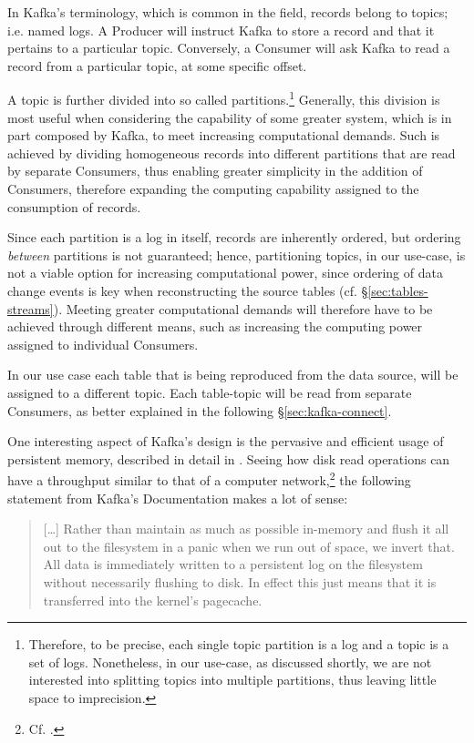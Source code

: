 In Kafka's terminology, which is common in the field, records belong to topics; i.e. named logs.
A Producer will instruct Kafka to store a record and that it pertains to a particular topic.
Conversely, a Consumer will ask Kafka to read a record from a particular topic, at some specific offset.

A topic is further divided into so called partitions.\footnote{%
	Therefore, to be precise, each single topic partition is a log and a topic is a set of logs.
	Nonetheless, in our use-case, as discussed shortly, we are not interested into splitting topics into multiple partitions, thus leaving little space to imprecision.
}
Generally, this division is most useful when considering the capability of some greater system, which is in part composed by Kafka, to meet increasing computational demands.
Such is achieved by dividing homogeneous records into different partitions that are read by separate Consumers, thus enabling greater simplicity in the addition of Consumers, therefore expanding the computing capability assigned to the consumption of records.

Since each partition is a log in itself, records are inherently ordered, but ordering \emph{between} partitions is not guaranteed; hence, partitioning topics, in our use-case, is not a viable option for increasing computational power, since ordering of data change events is key when reconstructing the source tables (cf. \S \ref{sec:tables-streams}).
Meeting greater computational demands will therefore have to be achieved through different means, such as increasing the computing power assigned to individual Consumers.

In our use case each table that is being reproduced from the data source, will be assigned to a different topic.
Each table-topic will be read from separate Consumers, as better explained in the following \S \ref{sec:kafka-connect}.

One interesting aspect of Kafka's design is the pervasive and efficient usage of persistent memory, described in detail in \cite[\S 4.2, and \S 4.3]{kafka-docs}.
Seeing how disk read operations can have a throughput similar to that of a computer network,\footnote{%
	Cf. \cite{pathologies-big-data}.
} the following statement from Kafka's Documentation makes a lot of sense:
\begin{quote}
	[\ldots] Rather than maintain as much as possible in-memory and flush it all out to the filesystem in a panic when we run out of space, we invert that. All data is immediately written to a persistent log on the filesystem without necessarily flushing to disk. In effect this just means that it is transferred into the kernel's pagecache.
\end{quote}

